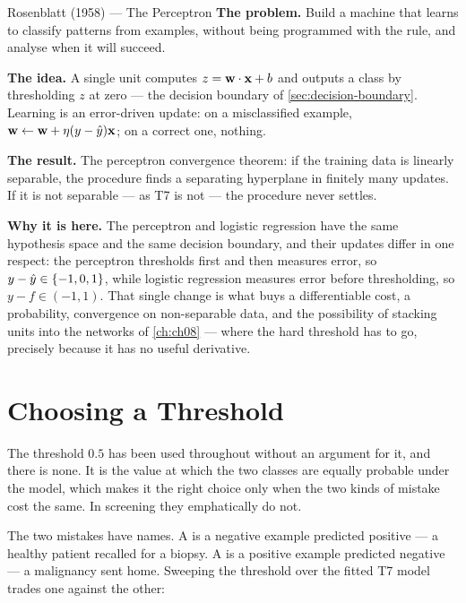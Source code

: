 \begin{researchspotlight}{Rosenblatt (1958) --- The Perceptron}
\textbf{The problem.} Build a machine that learns to classify patterns from
examples, without being programmed with the rule, and analyse when it will
succeed.

\textbf{The idea.} A single unit computes $z = \mathbf{w}\cdot\mathbf{x} + b$ and outputs a
class by thresholding $z$ at zero --- the decision boundary of
\cref{sec:decision-boundary}. Learning is an error-driven update: on a
misclassified example, $\mathbf{w} \leftarrow \mathbf{w} + \eta(y-\hat{y})\mathbf{x}$; on a correct one,
nothing.

\textbf{The result.} The perceptron convergence theorem: if the training data is
linearly separable, the procedure finds a separating hyperplane in finitely many
updates. If it is not separable --- as T7 is not --- the procedure never settles.

\textbf{Why it is here.} The perceptron and logistic regression have the same
hypothesis space and the same decision boundary, and their updates differ in one
respect: the perceptron thresholds first and then measures error, so
$y - \hat{y} \in \{-1,0,1\}$, while logistic regression measures error before
thresholding, so $y - f \in (-1,1)$. That single change is what buys a
differentiable cost, a probability, convergence on non-separable data, and the
possibility of stacking units into the networks of \cref{ch:ch08} --- where the
hard threshold has to go, precisely because it has no useful derivative.
\parencite{rosenblatt1958}
\end{researchspotlight}

\section{Choosing a Threshold}
\label{sec:threshold}

The threshold $0.5$ has been used throughout without an argument for it, and
there is none. It is the value at which the two classes are equally probable
under the model, which makes it the right choice only when the two kinds of
mistake cost the same. In screening they emphatically do not.

The two mistakes have names. A  is a negative example
predicted positive --- a healthy patient recalled for a biopsy. A
 is a positive example predicted negative --- a
malignancy sent home. Sweeping the threshold over the fitted T7 model trades one
against the other:

